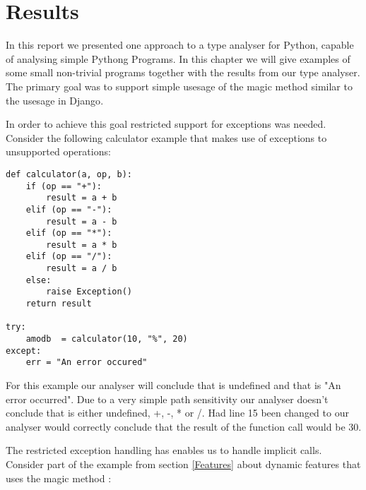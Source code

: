 \chapter{Results}
\label{chapter:results}
In this report we presented one approach to a type analyser for Python, capable of analysing simple Pythong Programs. In this chapter we will give examples of some small non-trivial programs together with the results from our type analyser. The primary goal was to support simple usesage of the magic method  similar to the usesage in Django\cite{django}.


In order to achieve this goal restricted support for exceptions was needed. Consider the following calculator example that makes use of exceptions to unsupported operations:

\begin{listing}[H]
	\begin{verbatim}
def calculator(a, op, b):
	if (op == "+"):
		result = a + b
	elif (op == "-"):
		result = a - b
	elif (op == "*"):
		result = a * b
	elif (op == "/"):
		result = a / b
	else:
		raise Exception()
	return result

try:
	amodb  = calculator(10, "%", 20)
except:
	err = "An error occured"
	\end{verbatim}
\end{listing}

For this example our analyser will conclude that  is undefined and that  is "An error occurred". Due to a very simple path sensitivity our analyser doesn't conclude that  is either undefined, +, -, * or /. Had line 15 been changed to  our analyser would correctly conclude that the result of the function call would be 30.

The restricted exception handling has enables us to handle implicit  calls. Consider part of the  example from section \ref{Features} about dynamic features that uses the magic method :

